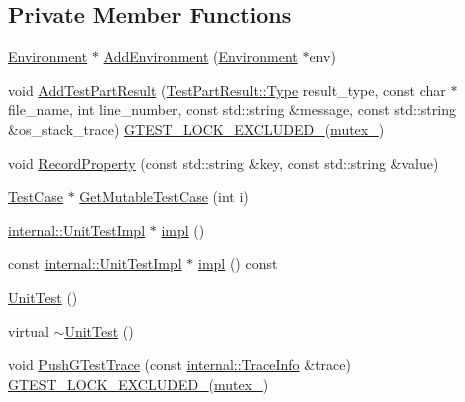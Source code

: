 \subsection*{Private Member Functions}
\begin{DoxyCompactItemize}
\item 
\hyperlink{classtesting_1_1Environment}{Environment} $\ast$ \hyperlink{classtesting_1_1UnitTest_a1eb8e999b8696889bf1c64b4f0161203}{Add\+Environment} (\hyperlink{classtesting_1_1Environment}{Environment} $\ast$env)
\item 
void \hyperlink{classtesting_1_1UnitTest_a1d157d2e9a5c1d3405333410c6b13932}{Add\+Test\+Part\+Result} (\hyperlink{classtesting_1_1TestPartResult_a65ae656b33fdfdfffaf34858778a52d5}{Test\+Part\+Result\+::\+Type} result\+\_\+type, const char $\ast$file\+\_\+name, int line\+\_\+number, const std\+::string \&message, const std\+::string \&os\+\_\+stack\+\_\+trace) \hyperlink{gtest-port_8h_a69abff5a4efdd07bd5faebe3dd318d06}{G\+T\+E\+S\+T\+\_\+\+L\+O\+C\+K\+\_\+\+E\+X\+C\+L\+U\+D\+E\+D\+\_\+}(\hyperlink{classtesting_1_1UnitTest_abb94ef45cf0ab43be81ac6d5b1364132}{mutex\+\_\+})
\item 
void \hyperlink{classtesting_1_1UnitTest_a2c96a4a02c34095e07c6999e7686367f}{Record\+Property} (const std\+::string \&key, const std\+::string \&value)
\item 
\hyperlink{classtesting_1_1TestCase}{Test\+Case} $\ast$ \hyperlink{classtesting_1_1UnitTest_ad741830280b12c07874b2d37a6ee5c02}{Get\+Mutable\+Test\+Case} (int i)
\item 
\hyperlink{classtesting_1_1internal_1_1UnitTestImpl}{internal\+::\+Unit\+Test\+Impl} $\ast$ \hyperlink{classtesting_1_1UnitTest_a4df5d11a58affb337d7fa62eaa07690e}{impl} ()
\item 
const \hyperlink{classtesting_1_1internal_1_1UnitTestImpl}{internal\+::\+Unit\+Test\+Impl} $\ast$ \hyperlink{classtesting_1_1UnitTest_a266a9f49070d1959c1c9d649423879b4}{impl} () const
\item 
\hyperlink{classtesting_1_1UnitTest_a5e646d37f980429c310af696c8775f5c}{Unit\+Test} ()
\item 
virtual \hyperlink{classtesting_1_1UnitTest_a8b66a9332e29673a6a389ea1731ee6b2}{$\sim$\+Unit\+Test} ()
\item 
void \hyperlink{classtesting_1_1UnitTest_af455b953108ff09b3b6e41011653e78a}{Push\+G\+Test\+Trace} (const \hyperlink{structtesting_1_1internal_1_1TraceInfo}{internal\+::\+Trace\+Info} \&trace) \hyperlink{gtest-port_8h_a69abff5a4efdd07bd5faebe3dd318d06}{G\+T\+E\+S\+T\+\_\+\+L\+O\+C\+K\+\_\+\+E\+X\+C\+L\+U\+D\+E\+D\+\_\+}(\hyperlink{classtesting_1_1UnitTest_abb94ef45cf0ab43be81ac6d5b1364132}{mutex\+\_\+})

\end{DoxyCompactItemize}

